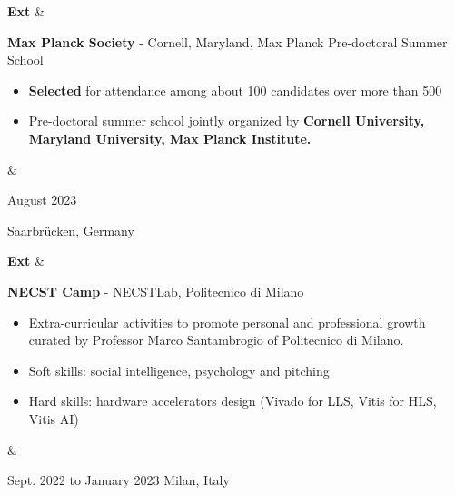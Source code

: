 \documentclass[10pt, letterpaper]{article}
\newenvironment{highlights}{
        \begin{itemize}[
                topsep=0pt,
                parsep=0.10 cm,
                partopsep=0pt,
                itemsep=0pt,
                after=\vspace{-1\baselineskip},
                leftmargin=0.4 cm + 3pt
            ]
    }{
        \end{itemize}
    } %
\let\originalTabularx\tabularx
\let\originalEndTabularx\endtabularx
\renewenvironment{tabularx}{\bgroup\centering\originalTabularx}{\originalEndTabularx\par\egroup}
\begin{document}
  \begin{tabularx}{
            \textwidth-0.4 cm-0.13cm
        }{
            L{0.85cm}
            K{0.2 cm}
            R{4.1 cm}
        }
            \textbf{Ext}
            &
            
            \textbf{       Max Planck Society} - Cornell, Maryland, Max Planck Pre-doctoral Summer School
            
            \vspace{0.20 cm}

            \begin{highlights}
                \item \textbf{Selected} for attendance among about 100 candidates over more than 500 
                \item Pre-doctoral summer school jointly organized by \textbf{Cornell University, Maryland University, Max Planck Institute.}
            \end{highlights}
            &
            

                August 2023                               
                
            Saarbrücken, Germany
        \end{tabularx}
\begin{tabularx}{
            \textwidth-0.4 cm-0.13cm
        }{
            L{0.85cm}
            K{0.2 cm}
            R{4.1 cm}
        }
            \textbf{Ext}
            &
            
            \textbf{NECST Camp} - NECSTLab, Politecnico di Milano

            \vspace{0.10 cm}
\begin{highlights}
    \item Extra-curricular activities to promote personal and professional growth curated by Professor Marco Santambrogio of Politecnico di Milano.
    \item Soft skills: social intelligence, psychology and pitching
    \item Hard skills: hardware accelerators design (Vivado for LLS, Vitis for HLS, Vitis AI)
\end{highlights}
            
            &
            

            Sept. 2022 to January 2023
            Milan, Italy
        \end{tabularx}
\end{document}
